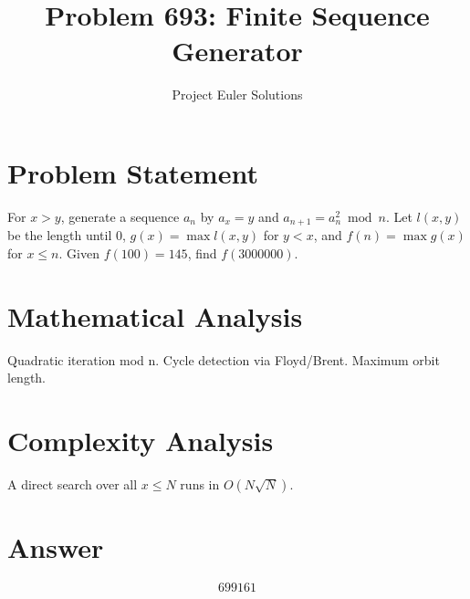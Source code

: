 \documentclass[11pt]{article}
\title{Problem 693: Finite Sequence Generator}
\author{Project Euler Solutions}
\date{}
\begin{document}
\maketitle

\section{Problem Statement}

For $x > y$, generate a sequence $a_n$ by $a_x=y$ and $a_{n+1}=a_n^2 \bmod n$. Let $l(x,y)$ be the length until 0, $g(x)=\max l(x,y)$ for $y<x$, and $f(n)=\max g(x)$ for $x\le n$. Given $f(100)=145$, find $f(3000000)$.

\section{Mathematical Analysis}

Quadratic iteration mod n. Cycle detection via Floyd/Brent. Maximum orbit length.

\section{Complexity Analysis}

A direct search over all $x \le N$ runs in $O(N\sqrt{N})$.

\section{Answer}

\[
\boxed{699161}
\]
\end{document}
